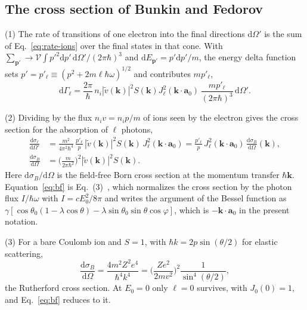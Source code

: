 \documentclass[11pt]{article}
\numberwithin{equation}{section}
\newcommand{\Vol}{\mathcal V}
\newcommand{\av}{\mathbf a_0}
\newcommand{\kv}{\mathbf k}
\newcommand{\pv}{\mathbf p}
\newcommand{\dd}{\mathrm d}
\begin{document}
\subsection{The cross section of Bunkin and Fedorov}
\label{sec:bf}
{\noindent}(1) The rate of transitions of one electron into the final
directions $\dd\Omega'$ is the sum of Eq.~\eqref{eq:rate-ions} over the final
states in that cone. With $\sum_{\pv'}\to\Vol\int p'^2\dd p'\,\dd\Omega'/(2\pi\hbar)^3$
and $\dd E_{\pv'}=p'\dd p'/m$, the energy delta function sets
$p'=p'_\ell\equiv(p^2+2m\ell\hbar\omega)^{1/2}$ and contributes $mp'_\ell$,
\begin{equation}
\dd\Gamma_\ell=\frac{2\pi}{\hbar}\,n_i|\tilde v(\kv)|^2S(\kv)J_\ell^2(\kv\cdot\av)\,
\frac{mp'_\ell}{(2\pi\hbar)^3}\,\dd\Omega'.
\end{equation}

{\noindent}(2) Dividing by the flux $n_iv=n_ip/m$ of ions seen by the electron
gives the cross section for the absorption of $\ell$ photons,
\begin{equation}
\boxed{\;\begin{aligned}
\frac{\dd\sigma_\ell}{\dd\Omega'}&=\frac{m^2}{4\pi^2\hbar^4}\,\frac{p'_\ell}{p}\,
|\tilde v(\kv)|^2S(\kv)\,J_\ell^2(\kv\cdot\av)
=\frac{p'_\ell}{p}\,J_\ell^2(\kv\cdot\av)\,\frac{\dd\sigma_B}{\dd\Omega}(\kv),\\
\frac{\dd\sigma_B}{\dd\Omega}&=\Big(\frac{m}{2\pi\hbar^2}\Big)^2|\tilde v(\kv)|^2S(\kv).
\end{aligned}\;}
\label{eq:bf}
\end{equation}
Here $\dd\sigma_B/\dd\Omega$ is the field-free Born cross section at the
momentum transfer $\hbar\kv$. Equation~\eqref{eq:bf} is
Eq.~(3)~\cite{BunkinFedorov1966}, which normalizes the cross section by the
photon flux $I/\hbar\omega$ with $I=cE_0^2/8\pi$ and writes the argument of the
Bessel function as $\gamma[\cos\theta_0(1-\lambda\cos\theta)-\lambda\sin\theta_0\sin\theta\cos\varphi]$,
which is $-\kv\cdot\av$ in the present notation.

{\noindent}(3) For a bare Coulomb ion and $S=1$, with $\hbar k=2p\sin(\theta/2)$
for elastic scattering,
\begin{equation}
\frac{\dd\sigma_B}{\dd\Omega}=\frac{4m^2Z^2e^4}{\hbar^4k^4}=\Big(\frac{Ze^2}{2mv^2}\Big)^2\frac{1}{\sin^4(\theta/2)},
\label{eq:rutherford}
\end{equation}
the Rutherford cross section. At $E_0=0$ only $\ell=0$ survives, with
$J_0(0)=1$, and Eq.~\eqref{eq:bf} reduces to it.
\end{document}
